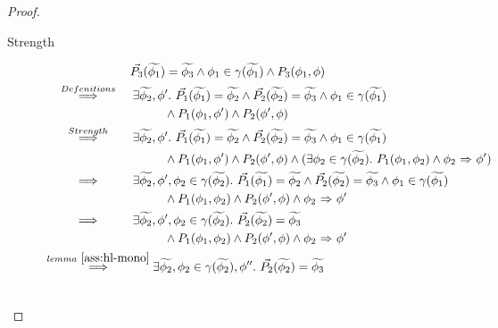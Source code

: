 \begin{proof}
\begin{description}
        \item[Strength]
        \begin{align*}
        & \phantom{\overset{}{~\quad\quad\implies\quad\quad~}}~
        \dgrad{P_3}(\grad{\phi_1}) = \grad{\phi_3} \wedge \phi_1 \in \gamma(\grad{\phi_1}) \wedge P_3(\phi_1, \phi)\\
        & \overset{Defenitions}{~\quad\quad\implies\quad\quad~} 
        \exists \grad{\phi_2}, \phi'.~ 
        \dgrad{P_1}(\grad{\phi_1}) = \grad{\phi_2} \wedge \dgrad{P_2}(\grad{\phi_2}) = \grad{\phi_3} \wedge 
        \phi_1 \in \gamma(\grad{\phi_1}) \\
        & \quad\quad\quad\quad\quad\quad\quad\quad\quad\quad
        \wedge P_1(\phi_1, \phi') \wedge P_2(\phi', \phi)\\
        & \overset{Strength}{~\quad\quad\implies\quad\quad~} 
        \exists \grad{\phi_2}, \phi'.~ 
        \dgrad{P_1}(\grad{\phi_1}) = \grad{\phi_2} \wedge \dgrad{P_2}(\grad{\phi_2}) = \grad{\phi_3} \wedge 
        \phi_1 \in \gamma(\grad{\phi_1}) \\
        & \quad\quad\quad\quad\quad\quad\quad\quad\quad\quad
         \wedge P_1(\phi_1, \phi') \wedge P_2(\phi', \phi)
        \wedge (\exists \phi_2 \in \gamma(\grad{\phi_2}).~ P_1(\phi_1, \phi_2) \wedge \phiImplies{\phi_2}{\phi'}) \\
        & \overset{}{~\quad\quad\implies\quad\quad~} 
        \exists \grad{\phi_2}, \phi', \phi_2 \in \gamma(\grad{\phi_2}).~ 
        \dgrad{P_1}(\grad{\phi_1}) = \grad{\phi_2} \wedge \dgrad{P_2}(\grad{\phi_2}) = \grad{\phi_3} \wedge 
        \phi_1 \in \gamma(\grad{\phi_1}) \\
        & \quad\quad\quad\quad\quad\quad\quad\quad\quad\quad
        \wedge P_1(\phi_1, \phi_2) \wedge P_2(\phi', \phi)
        \wedge \phiImplies{\phi_2}{\phi'} \\
        & \overset{}{~\quad\quad\implies\quad\quad~} 
        \exists \grad{\phi_2}, \phi', \phi_2 \in \gamma(\grad{\phi_2}).~ 
        \dgrad{P_2}(\grad{\phi_2}) = \grad{\phi_3}  \\
        & \quad\quad\quad\quad\quad\quad\quad\quad\quad\quad
        \wedge P_1(\phi_1, \phi_2) \wedge P_2(\phi', \phi)
        \wedge \phiImplies{\phi_2}{\phi'} \\
        & \overset{lemma~\ref{ass:hl-mono}}{~\quad\quad\implies\quad\quad~} 
        \exists \grad{\phi_2}, \phi_2 \in \gamma(\grad{\phi_2}), \phi''.~ 
        \dgrad{P_2}(\grad{\phi_2}) = \grad{\phi_3}   \\
        & \quad\quad\quad\quad\quad\quad\quad\quad\quad\quad

\end{align*}
\end{description}
\end{proof}
